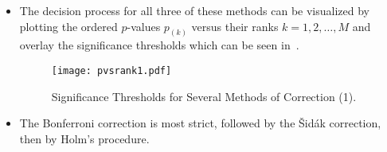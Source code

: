 \begin{itemize}
      \item The decision process for all three of these methods can be visualized by plotting the ordered $p$-values
            $ p_{(k)} $ versus their ranks $ k=1,2,\ldots,M $ and overlay the significance thresholds which can
            be seen in~.
            \begin{figure}[!htbp]
                  \centering
                  \texttt{[image: pvsrank1.pdf]}
                  \caption{Significance Thresholds for Several Methods of Correction (1).}\label{fig:pvsrank1}
            \end{figure}
      \item The Bonferroni correction is most strict, followed by the Šidák correction, then by Holm's procedure.
\end{itemize}
